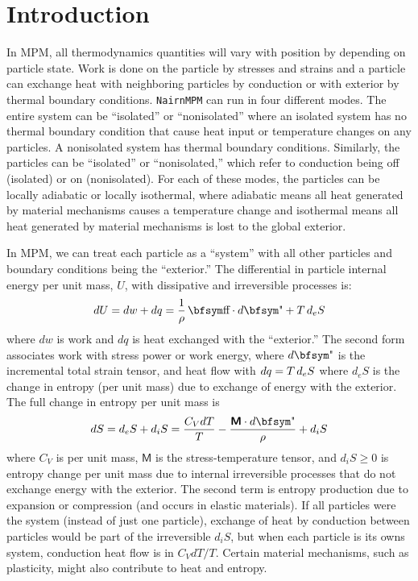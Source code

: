 \documentclass[11pt]{book}
\newcommand{\tens}[1]{\boldsymbol{\mathsf{#1}}}
\def\st{{\hbox{\bfsym\char'033}}}
\def\et{{\hbox{\bfsym\char'042}}}
\begin{document}
\section{Introduction}


In MPM, all thermodynamics quantities will vary with position by depending on particle state. Work is done on the particle by stresses and strains and a particle can exchange heat with neighboring particles by conduction or with exterior by thermal boundary conditions. {\tt NairnMPM} can run in four different modes. The entire system can be ``isolated'' or ``nonisolated'' where an isolated system has no thermal boundary condition that cause heat input or temperature changes on any particles. A nonisolated system has thermal boundary conditions. Similarly, the particles can be ``isolated'' or ``nonisolated,'' which refer to conduction being off (isolated) or on (nonisolated). For each of these modes, the particles can be locally adiabatic or locally isothermal, where adiabatic means all heat generated by material mechanisms causes a temperature change and isothermal means all heat generated by material mechanisms is lost to the global exterior.

In MPM, we can treat each particle as a ``system'' with all other particles and boundary conditions being the ``exterior.''
The differential in particle internal energy per unit mass, $U$, with dissipative and irreversible processes is:
\begin{equation}%
      dU = dw + dq = {1\over \rho}\thinspace \st\cdot d\et + T \thinspace d_eS
\end{equation}%
where $dw$ is work and $dq$ is heat exchanged with the ``exterior.'' The second form associates work with stress power or work energy, where $d\et$ is the incremental total strain tensor, and heat flow with $dq = T \thinspace d_eS$ where $d_eS$ is the change in entropy (per unit mass) due to exchange of energy with the exterior. The full change in entropy per unit mass is
\begin{equation}%
      dS = d_eS + d_iS = {C_V dT\over T} - {\tens{M}\cdot d\et\over \rho} + d_iS
\end{equation}%
where $C_V$ is per unit mass, $\tens{M}$ is the stress-temperature tensor, and $d_iS\ge0$ is entropy change per unit mass due to internal irreversible processes that do not exchange energy with the exterior. The second term is entropy production due to expansion or compression (and occurs in elastic materials). If all particles were the system (instead of just one particle), exchange of heat by conduction between particles would be part of the irreversible $d_iS$, but when each particle is its owns system, conduction heat flow is in $C_VdT/T$. Certain material mechanisms, such as plasticity, might also contribute to heat and entropy.
\end{document}
